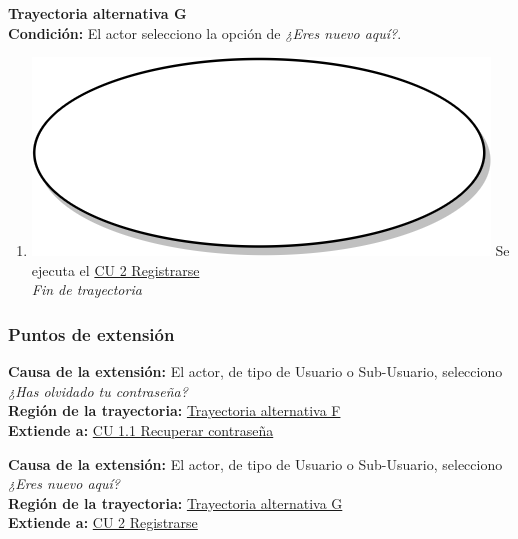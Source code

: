 \textbf{Trayectoria alternativa G} \label{cu1_ta_g}\\
\textbf{Condición:} El actor selecciono la opción de \textit{¿Eres nuevo aquí?}.\\
 \begin{enumerate}[label=G\arabic*]
    \item {\includegraphics[scale=.05]{Capitulo3/img/proceso.png} Se ejecuta el \hyperref[cu2]{CU 2 Registrarse}} \\
    \textit{Fin de trayectoria} \\
\end{enumerate}

\subsubsection{Puntos de extensión}
\noindent \textbf{Causa de la extensión:} El actor, de tipo de Usuario o Sub-Usuario, selecciono \textit{¿Has olvidado tu contraseña?} \\
\textbf{Región de la trayectoria:} \hyperref[cu1_ta_f]{Trayectoria alternativa F} \\
\textbf{Extiende a:} \hyperref[cu1_1]{CU 1.1 Recuperar contraseña} \\ \par

\noindent \textbf{Causa de la extensión:} El actor, de tipo de Usuario o Sub-Usuario, selecciono \textit{¿Eres nuevo aquí?} \\
\textbf{Región de la trayectoria:} \hyperref[cu1_ta_g]{Trayectoria alternativa G} \\
\textbf{Extiende a:} \hyperref[cu2]{CU 2 Registrarse}
